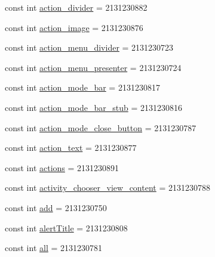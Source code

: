 \begin{DoxyCompactItemize}
\item 
const int \mbox{\hyperlink{class_f_w_p_s___app_1_1_droid_1_1_resource_1_1_id_a487120b6b0c69e8a8f8137d2f6dc9730}{action\+\_\+divider}} = 2131230882
\item 
const int \mbox{\hyperlink{class_f_w_p_s___app_1_1_droid_1_1_resource_1_1_id_a61407c34be88466ef8f34e2160247574}{action\+\_\+image}} = 2131230876
\item 
const int \mbox{\hyperlink{class_f_w_p_s___app_1_1_droid_1_1_resource_1_1_id_acade1705c245f9eb9fc017c51da1852a}{action\+\_\+menu\+\_\+divider}} = 2131230723
\item 
const int \mbox{\hyperlink{class_f_w_p_s___app_1_1_droid_1_1_resource_1_1_id_a3a455252c38fa759b2085a99741c9b30}{action\+\_\+menu\+\_\+presenter}} = 2131230724
\item 
const int \mbox{\hyperlink{class_f_w_p_s___app_1_1_droid_1_1_resource_1_1_id_a74a15d4750282d46dce7b06c137777fd}{action\+\_\+mode\+\_\+bar}} = 2131230817
\item 
const int \mbox{\hyperlink{class_f_w_p_s___app_1_1_droid_1_1_resource_1_1_id_aea3b0d81488c9295a30d032d881732ab}{action\+\_\+mode\+\_\+bar\+\_\+stub}} = 2131230816
\item 
const int \mbox{\hyperlink{class_f_w_p_s___app_1_1_droid_1_1_resource_1_1_id_a5835e455c310fe79f4ae82101bc33b5e}{action\+\_\+mode\+\_\+close\+\_\+button}} = 2131230787
\item 
const int \mbox{\hyperlink{class_f_w_p_s___app_1_1_droid_1_1_resource_1_1_id_a5aa65ca0ca7a9115699484b933e38c84}{action\+\_\+text}} = 2131230877
\item 
const int \mbox{\hyperlink{class_f_w_p_s___app_1_1_droid_1_1_resource_1_1_id_a49aad6317b1d21faaec5184562ead90f}{actions}} = 2131230891
\item 
const int \mbox{\hyperlink{class_f_w_p_s___app_1_1_droid_1_1_resource_1_1_id_acd29ad7fedf9bcb21d6c98bd2d891eb9}{activity\+\_\+chooser\+\_\+view\+\_\+content}} = 2131230788
\item 
const int \mbox{\hyperlink{class_f_w_p_s___app_1_1_droid_1_1_resource_1_1_id_ac75d5f95c111c015261babe71d0585ec}{add}} = 2131230750
\item 
const int \mbox{\hyperlink{class_f_w_p_s___app_1_1_droid_1_1_resource_1_1_id_a76390759d88910cd98bc501070b68ac9}{alert\+Title}} = 2131230808
\item 
const int \mbox{\hyperlink{class_f_w_p_s___app_1_1_droid_1_1_resource_1_1_id_a27ec8bd78ea40cc5c0a282e2fd6b60e1}{all}} = 2131230781
\item 

\end{DoxyCompactItemize}
